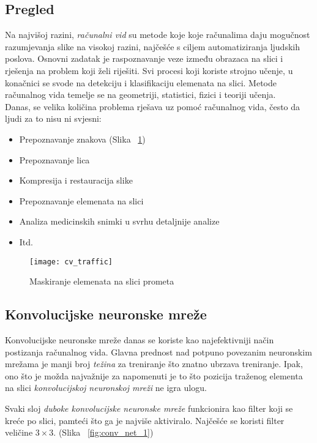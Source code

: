\subsection{Pregled}
Na najvišoj razini, \emph{računalni vid} su metode koje koje računalima daju mogučnost razumjevanja slike na visokoj razini, najčešće s ciljem automatiziranja ljudskih poslova.
Osnovni zadatak je raspoznavanje veze između obrazaca na slici i rješenja na problem koji želi riješiti. Svi procesi koji koriste strojno učenje, u konačnici se svode na  detekciju i klasifikaciju elemenata na slici. Metode računalnog vida temelje se na geometriji, statistici, fizici i teoriji učenja. \\
Danas, se velika količina problema rješava uz pomoć računalnog vida, često da ljudi za to nisu ni svjesni:
\begin{itemize}
\item Prepoznavanje znakova (Slika ~\ref{fig:cv_traffic_1})	
\item Prepoznavanje lica
\item Kompresija i restauracija slike
\item Prepoznavanje elemenata na slici
\item Analiza medicinskih snimki u svrhu detaljnije analize
\item Itd.
\end{itemize} 

\begin{figure}[h!]
	\centering
	\texttt{[image: cv\_traffic]}
	 \caption{Maskiranje elemenata na slici prometa}
 	 \label{fig:cv_traffic_1}
\end{figure}

\subsection{Konvolucijske neuronske mreže}
Konvolucijske neuronske mreže danas se koriste kao najefektivniji način postizanja računalnog vida. Glavna prednost nad potpuno povezanim neuronskim mrežama je manji broj \emph{težina} za treniranje što znatno ubrzava treniranje. Ipak, ono što je možda najvažnije za napomenuti je to što pozicija traženog elementa na slici \emph{konvolucijskoj neuronskoj mreži} ne igra ulogu. 

Svaki sloj \emph{duboke konvolucijske neuronske mreže} funkcionira kao filter koji se kreće po slici, pamteći što ga je najviše aktiviralo. Najčešće se koristi filter veličine $3\times3$.
(Slika ~\ref{fig:conv_net_1})


